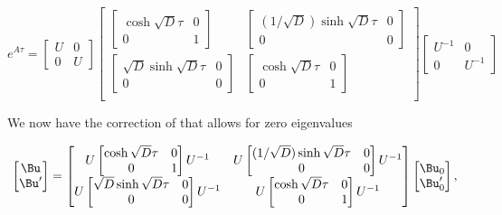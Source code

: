 \begin{dmath}\label{eqn:threeSpringLoopattemptII:700}
e^{A\tau}
=
\begin{bmatrix}
U & 0 \\
0 & U
\end{bmatrix}
\begin{bmatrix}
\begin{bmatrix}
\cosh \sqrt{D} \tau  & 0 \\
0 & 1
\end{bmatrix} &
\begin{bmatrix}
(1/\sqrt{D}) \sinh \sqrt D \tau & 0 \\
0 & 0
\end{bmatrix} \\
\begin{bmatrix}
\sqrt{D} \sinh \sqrt D \tau & 0 \\
0 & 0
\end{bmatrix} &
\begin{bmatrix}
\cosh \sqrt{D} \tau  & 0 \\
0 & 1
\end{bmatrix} \\
\end{bmatrix}
\begin{bmatrix}
U^{-1} & 0 \\
0 & U^{-1}
\end{bmatrix}
\end{dmath}

We now have the correction of  that allows for zero eigenvalues

\begin{dmath}\label{eqn:threeSpringLoopattemptII:720}
\begin{bmatrix}
\Bu \\
\Bu'
\end{bmatrix}
=
\begin{bmatrix}
U
\begin{bmatrix}
\cosh \sqrt{D} \tau  & 0 \\
0 & 1
\end{bmatrix} U^{-1}
&
U \begin{bmatrix}
(1/\sqrt{D}) \sinh \sqrt D \tau & 0 \\
0 & 0
\end{bmatrix} U^{-1}
\\
U \begin{bmatrix}
\sqrt{D} \sinh \sqrt D \tau & 0 \\
0 & 0
\end{bmatrix} U^{-1}
&
U \begin{bmatrix}
\cosh \sqrt{D} \tau  & 0 \\
0 & 1
\end{bmatrix} U^{-1}
\\
\end{bmatrix}
\begin{bmatrix}
\Bu_0 \\
\Bu_0'
\end{bmatrix},
\end{dmath}

